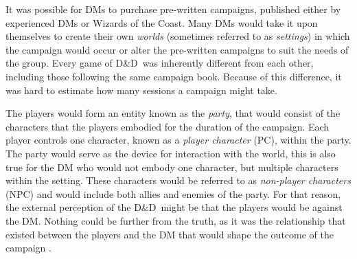 \documentclass[final]{cmpreport}
\newcommand{\WotC}{Wizards of the Coast}
\newcommand{\dnd}{D\&D}
\begin{document}
			It was possible for DMs to purchase pre-written campaigns, published either by experienced DMs or \WotC. Many DMs would take it upon themselves to create their own \textit{worlds} (sometimes referred to as \textit{settings}) in which the campaign would occur or alter the pre-written campaigns to suit the needs of the group. Every game of \dnd \ was inherently different from each other, including those following the same campaign book. Because of this difference, it was hard to estimate how many sessions a campaign might take. 
			
			The players would form an entity known as the \emph{party}, that would consist of the characters that the players embodied for the duration of the campaign. Each player controls one character, known as a \emph{player character} (PC), within the party. The party would serve as the device for interaction with the world, this is also true for the DM who would not embody one character, but multiple characters within the setting. These characters would be referred to as \emph{non-player characters} (NPC) and would include both allies and enemies of the party. For that reason, the external perception of the \dnd \ might be that the players would be against the DM. Nothing could be further from the truth, as it was the relationship that existed between the players and the DM that would shape the outcome of the campaign \citep{DnDPeople}.
			
\end{document}

